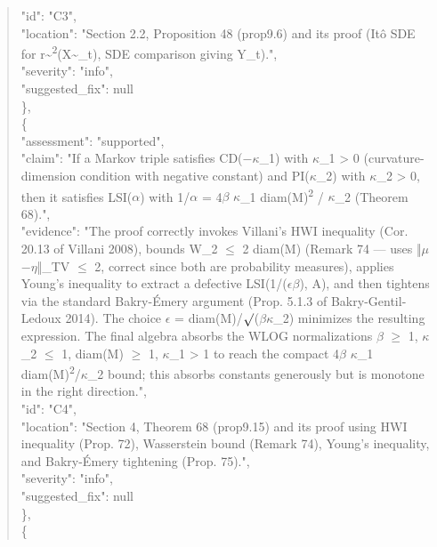 \documentclass[11pt]{article}
\begin{document}
\begin{quote}
      "id": "C3",\\
      "location": "Section 2.2, Proposition 48 (prop9.6) and its proof (Itô SDE for r\~{}\textsuperscript{2}(X\~{}\_t), SDE comparison giving Y\_t).",\\
      "severity": "info",\\
      "suggested\_fix": null\\
    \},\\
    \{\\
      "assessment": "supported",\\
      "claim": "If a Markov triple satisfies CD(\ensuremath{-}\ensuremath{\kappa}\_1) with \ensuremath{\kappa}\_1 > 0 (curvature-dimension condition with negative constant) and PI(\ensuremath{\kappa}\_2) with \ensuremath{\kappa}\_2 > 0, then it satisfies LSI(\ensuremath{\alpha}) with 1/\ensuremath{\alpha} = 4\ensuremath{\beta} \ensuremath{\kappa}\_1 diam(M)\textsuperscript{2} / \ensuremath{\kappa}\_2 (Theorem 68).",\\
      "evidence": "The proof correctly invokes Villani's HWI inequality (Cor. 20.13 of Villani 2008), bounds W\_2 \ensuremath{\le} 2 diam(M) (Remark 74 --- uses ‖\ensuremath{\mu}\ensuremath{-}\ensuremath{\eta}‖\_TV \ensuremath{\le} 2, correct since both are probability measures), applies Young's inequality to extract a defective LSI(1/(\ensuremath{\epsilon}\ensuremath{\beta}), A), and then tightens via the standard Bakry-Émery argument (Prop. 5.1.3 of Bakry-Gentil-Ledoux 2014). The choice \ensuremath{\epsilon} = diam(M)/\ensuremath{\surd}(\ensuremath{\beta}\ensuremath{\kappa}\_2) minimizes the resulting expression. The final algebra absorbs the WLOG normalizations \ensuremath{\beta} \ensuremath{\ge} 1, \ensuremath{\kappa}\_2 \ensuremath{\le} 1, diam(M) \ensuremath{\ge} 1, \ensuremath{\kappa}\_1 > 1 to reach the compact 4\ensuremath{\beta} \ensuremath{\kappa}\_1 diam(M)\textsuperscript{2}/\ensuremath{\kappa}\_2 bound; this absorbs constants generously but is monotone in the right direction.",\\
      "id": "C4",\\
      "location": "Section 4, Theorem 68 (prop9.15) and its proof using HWI inequality (Prop. 72), Wasserstein bound (Remark 74), Young's inequality, and Bakry-Émery tightening (Prop. 75).",\\
      "severity": "info",\\
      "suggested\_fix": null\\
    \},\\
    \{\\

\end{quote}
\end{document}
